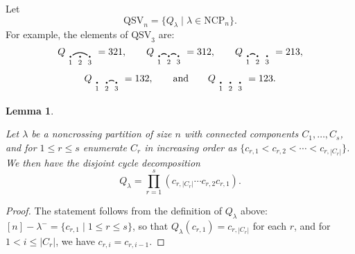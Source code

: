 \documentclass[12pt]{amsart}
\newtheorem{lem}[equation]{Lemma}
\theoremstyle{definition}
\theoremstyle{remark}
\numberwithin{equation}{section}
\renewcommand{\setminus}{-}
\newcommand{\QSV}{\mathrm{QSV}}
\newcommand{\NCP}{\mathrm{NCP}}
\begin{document}
Let
\[
\QSV_{n} = \{Q_{\lambda} \;|\; \lambda \in \NCP_{n} \}.
\]
For example, the elements of $\QSV_{3}$ are:
\[
Q_{\begin{tikzpicture}[scale = 0.35, baseline = 0.35*-0.2]
\foreach \x in {1, ..., 3}{\draw[fill] (\x - 1, 0) circle (2pt) node[inner sep = 2pt] (\x) {};}
\foreach \x in {1, ..., 3}{\node[below] at (\x) {$\scriptstyle \x$};}
\foreach \i\j in {1/3}{\draw[thick] (\i) to[out = 35, in = 145] (\j);}
\end{tikzpicture}} = 321, \qquad
Q_{\begin{tikzpicture}[scale = 0.35, baseline = 0.35*-0.2]
\foreach \x in {1, ..., 3}{\draw[fill] (\x - 1, 0) circle (2pt) node[inner sep = 2pt] (\x) {};}
\foreach \x in {1, ..., 3}{\node[below] at (\x) {$\scriptstyle \x$};}
\foreach \i\j in {1/2, 2/3}{\draw[thick] (\i) to[out = 35, in = 145] (\j);}
\end{tikzpicture}} = 312, \qquad
Q_{\begin{tikzpicture}[scale = 0.35, baseline = 0.35*-0.2]
\foreach \x in {1, ..., 3}{\draw[fill] (\x - 1, 0) circle (2pt) node[inner sep = 2pt] (\x) {};}
\foreach \x in {1, ..., 3}{\node[below] at (\x) {$\scriptstyle \x$};}
\foreach \i\j in {1/2}{\draw[thick] (\i) to[out = 35, in = 145] (\j);}
\end{tikzpicture}} = 213, 
\]
\[
Q_{\begin{tikzpicture}[scale = 0.35, baseline = 0.35*-0.2]
\foreach \x in {1, ..., 3}{\draw[fill] (\x - 1, 0) circle (2pt) node[inner sep = 2pt] (\x) {};}
\foreach \x in {1, ..., 3}{\node[below] at (\x) {$\scriptstyle \x$};}
\foreach \i\j in {2/3}{\draw[thick] (\i) to[out = 35, in = 145] (\j);}
\end{tikzpicture}} = 132, \qquad\text{and}\qquad
Q_{\begin{tikzpicture}[scale = 0.35, baseline = 0.35*-0.2]
\foreach \x in {1, ..., 3}{\draw[fill] (\x - 1, 0) circle (2pt) node[inner sep = 2pt] (\x) {};}
\foreach \x in {1, ..., 3}{\node[below] at (\x) {$\scriptstyle \x$};}
\end{tikzpicture}} = 123.
\]

\begin{lem}
\label{lem:QSVcycles}

Let $\lambda$ be a noncrossing partition of size $n$ with connected components $C_{1}, \ldots, C_{s}$, and for $1 \le r \le s$ enumerate $C_{r}$ in increasing order as $\{c_{r, 1} < c_{r, 2} < \cdots < c_{r, |C_{r}|}\}$. 
We then have the disjoint cycle decomposition
\[
Q_{\lambda} = \prod_{r = 1}^{s} (c_{r, |C_{r}|} \cdots c_{r, 2} c_{r, 1} ).
\]
\end{lem}
\begin{proof}
The statement follows from the definition of $Q_{\lambda}$ above: $[n] \setminus \lambda^{-} = \{c_{r, 1} \;|\; 1 \le r \le s\}$, so that $Q_{\lambda}(c_{r, 1}) =  c_{r, |C_{r}|}$ for each $r$, and for $1 < i \le |C_{r}|$, we have $c_{r, i} = c_{r, i-1}$.
\end{proof}
\end{document}
